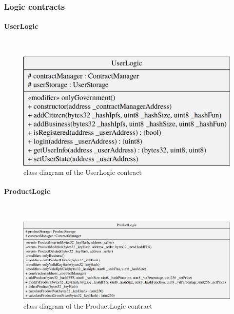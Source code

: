 \subsubsection{Logic contracts}
\paragraph{UserLogic}\mbox{}\\
\begin{figure}[H]
	\centering
	\includegraphics[scale=0.20]{res/images/solidity/userlogic.png}
	\caption{class diagram of the UserLogic contract}
\end{figure}

\paragraph{ProductLogic}\mbox{}\\
\begin{figure}[H]
	\centering
	\includegraphics[scale=0.25]{res/images/solidity/productlogic.png}
	\caption{class diagram of the ProductLogic contract}
\end{figure}

